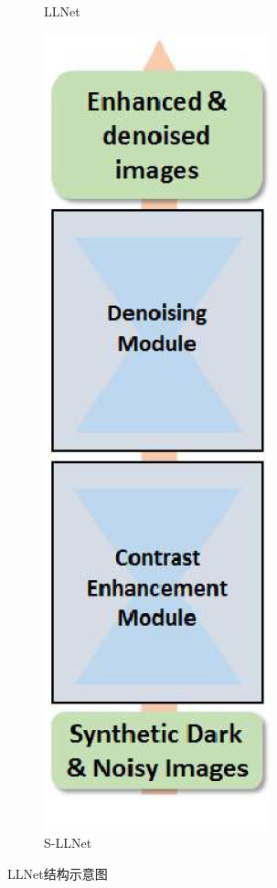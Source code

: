 \documentclass[a4paper]{ctexart}
\begin{document}
\begin{figure}[htb]
\begin{subfigure}{0.18\textwidth}
			\captionsetup{font=scriptsize}
			\caption{LLNet}
			\label{fig: LLNet}
		\end{subfigure}
		\begin{subfigure}{0.175\textwidth}
			\includegraphics[width=\linewidth]{picture/LLIE/LLNet/S-LLNet}
			\captionsetup{font=scriptsize}
			\caption{S-LLNet}
			\label{fig: S-LLNet}	
		\end{subfigure}
		\caption{
			\label{fig: LLNet Architecture}
			LLNet结构示意图
		}
	\end{figure}
	
\end{document}
